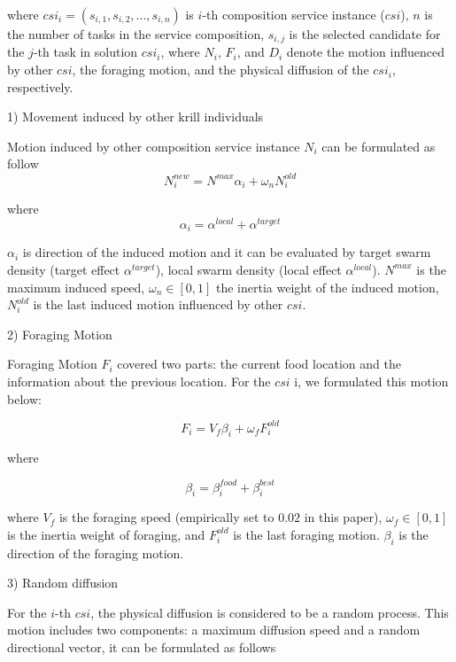 \documentclass[10pt,journal,compsoc]{IEEEtran}
\begin{document}
where $csi_i = (s_{i,1}, s_{i,2}, . . . , s_{i,n})$ is $i$-th composition service instance ($csi$), $n$ is the number of tasks in the service composition, $s_{i,j}$ is the selected candidate for the $j$-th task in solution $csi_i$, where $N_i$, $F_i$, and $D_i$ denote the motion influenced by other $csi$, the foraging motion, and the physical diffusion of the $csi_i$, respectively.

1) Movement induced by other krill individuals

Motion induced by other composition service instance $N_i$ can be formulated as follow
\begin{equation}
N^{new}_i = N^{max}\alpha_i + \omega_n N^{old}_i
\end{equation}

where
\begin{equation}
\alpha_i = \alpha^{local}+\alpha^{target}
\end{equation}

$\alpha_i$ is direction of the induced motion and it can be evaluated by target swarm density (target effect $\alpha^{target}$), local swarm density (local effect $\alpha^{local}$). $N^{max}$ is the maximum induced speed, $\omega_n \in [0, 1]$ the inertia weight of the induced motion, $N^{old}_{i}$ is the last induced motion influenced by other $csi$.

2) Foraging Motion

Foraging Motion $F_i$ covered two parts: the current food location and the information about the previous location. For the $csi$ i, we formulated this motion below:

\begin{equation}
F_i = V_f\beta_i + \omega_f F^{old}_i
\end{equation}

where

\begin{equation}
\beta_i = \beta_i^{food}+\beta_i^{best}
\end{equation}

where $V_f$ is the foraging speed (empirically set to $0.02$ in this paper), $\omega_f∈ [0, 1]$ is the inertia weight of foraging, and $F^{old}_i$ is the last foraging motion. $\beta_i$ is the direction of the foraging motion.

3) Random diffusion

For the $i$-th $csi$, the physical diffusion is considered to be a random process. This motion includes two components: a maximum diffusion speed and a random directional vector, it can be formulated as follows
\end{document}
